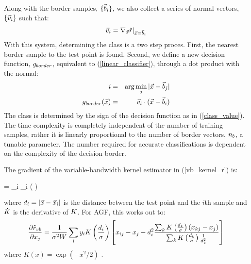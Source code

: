 Along with the border samples,  $\lbrace \vec b_i \rbrace$, we also
collect a series of normal vectors, $\lbrace \vec v_i \rbrace$
such that:
\begin{equation}
\vec v_i=\nabla_{\vec {x}}{\tilde r |_{\vec {x}=\vec b_i}}
\end{equation}
With this system, determining the class is a two step proces.
First, the nearest border sample to the test point is found.
Second, we define a new decision function, $g_{border}$, 
equivalent to (\ref{linear_classifier}), through a dot product with the normal:
\begin{eqnarray}
	i & = & \arg \min_j |\vec {x} - \vec b_j| \\ \nonumber
	g_{border}(\vec {x}) & = & \vec v_i \cdot (\vec {x} - \vec b_i)
	\label{border_decision}
\end{eqnarray}
The class is determined by the sign of the decision function as in 
(\ref{class_value}).
The time complexity is completely independent of the number
of training samples, rather it is linearly proportional to the number of
border vectors, $n_b$, a tunable parameter. The number required for
accurate classifications is dependent on the complexity of the decision
border.

The gradient of the variable-bandwidth kernel estimator in 
(\ref{vb_kernel_r}) is:
\begin{eqnnon}
	 = 
	 \sum_i \classlabel_i
	\scalarkernelderiv \left ( \right )
\label{kernel_gradient}
\end{eqnnon}
where $d_i=|\vec {x} - \vec {x}_i|$ is the distance between the 
test point and the $i$th sample and $\dot {K}$ is the derivative
of $K$.
For AGF, this works out to:
\begin{equation}
	\frac{\partial \tilde r_{vb}}{\partial x_j} = 
	\frac{1}{\sigma^2 W} \sum_i y_i
	K \left (\frac{d_i}{\sigma} \right )
	\left [x_{ij} - x_j
	- d_i^2 \frac{\sum_k K \left (\frac{d_k}{\sigma} \right )
	\left (x_{kj} - x_j \right )}
{\sum_k K \left (\frac{d_k}{\sigma} \right )\frac{1}{d_k^2}} \right ]
\label{vb_gradient}
\end{equation}
where $K(x)=\exp(-x^2/2)$ \citep{Mills2011}.

